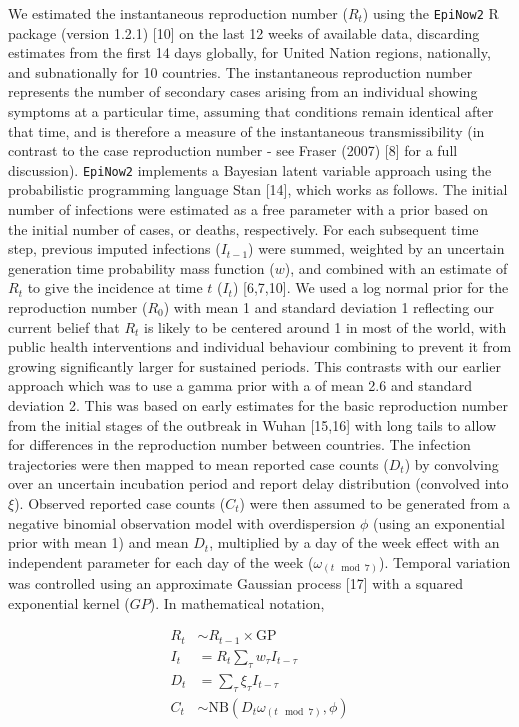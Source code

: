 \documentclass[
]{article}
\begin{document}
We estimated the instantaneous reproduction number (\(R_t\)) using the
\texttt{EpiNow2} R package (version 1.2.1) {[}10{]} on the last 12 weeks
of available data, discarding estimates from the first 14 days globally,
for United Nation regions, nationally, and subnationally for 10
countries. The instantaneous reproduction number represents the number
of secondary cases arising from an individual showing symptoms at a
particular time, assuming that conditions remain identical after that
time, and is therefore a measure of the instantaneous transmissibility
(in contrast to the case reproduction number - see Fraser (2007) {[}8{]}
for a full discussion). \texttt{EpiNow2} implements a Bayesian latent
variable approach using the probabilistic programming language Stan
{[}14{]}, which works as follows. The initial number of infections were
estimated as a free parameter with a prior based on the initial number
of cases, or deaths, respectively. For each subsequent time step,
previous imputed infections (\(I_{t-1}\)) were summed, weighted by an
uncertain generation time probability mass function (\(w\)), and
combined with an estimate of \(R_t\) to give the incidence at time \(t\)
(\(I_t\)) {[}6,7,10{]}. We used a log normal prior for the reproduction
number (\(R_0\)) with mean 1 and standard deviation 1 reflecting our
current belief that \(R_t\) is likely to be centered around 1 in most of
the world, with public health interventions and individual behaviour
combining to prevent it from growing significantly larger for sustained
periods. This contrasts with our earlier approach which was to use a
gamma prior with a of mean 2.6 and standard deviation 2. This was based
on early estimates for the basic reproduction number from the initial
stages of the outbreak in Wuhan {[}15,16{]} with long tails to allow for
differences in the reproduction number between countries. The infection
trajectories were then mapped to mean reported case counts (\(D_t\)) by
convolving over an uncertain incubation period and report delay
distribution (convolved into \(\xi\)). Observed reported case counts
(\(C_t\)) were then assumed to be generated from a negative binomial
observation model with overdispersion \(\phi\) (using an exponential
prior with mean 1) and mean \(D_t\), multiplied by a day of the week
effect with an independent parameter for each day of the week
(\(\omega_{(t \mod 7)}\)). Temporal variation was controlled using an
approximate Gaussian process {[}17{]} with a squared exponential kernel
(\(GP\)). In mathematical notation,

\begin{align}
  R_{t} &\sim R_{t-1} \times \mathrm{GP} \\
  I_t &= R_t \sum_\tau w_\tau I_{t - \tau} \\
  D_t &= \sum_\tau \xi_\tau I_{t-\tau} \\ 
  C_t &\sim \mathrm{NB}(D_t \omega_{(t \mod 7)} , \phi)
\end{align}
\end{document}
